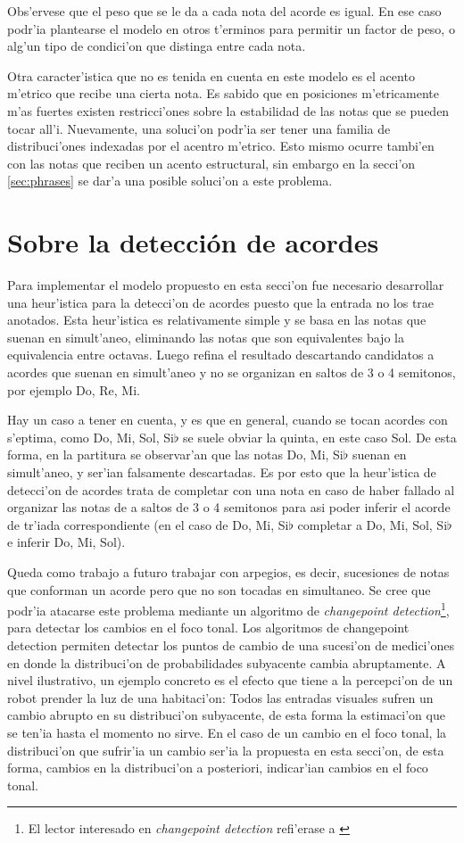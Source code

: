 Obs'ervese que el peso que se le da a cada nota del acorde es igual. En ese caso podr'ia plantearse el modelo en otros t'erminos para permitir un factor de peso, o
alg'un tipo de condici'on que distinga entre cada nota. 

Otra caracter'istica que no es tenida en cuenta en este modelo es el acento m'etrico que recibe una cierta nota. Es sabido que en posiciones m'etricamente m'as fuertes
existen restricci'ones sobre la estabilidad de las notas que se pueden tocar all'i. Nuevamente, una soluci'on podr'ia ser tener una familia de distribuci'ones indexadas
por el acentro m'etrico. Esto mismo ocurre tambi'en con las notas que reciben un acento estructural, sin embargo en la secci'on \ref{sec:phrases} se dar'a una posible
soluci'on a este problema. 

\section{Sobre la detecci\'on de acordes}
Para implementar el modelo propuesto en esta secci'on fue necesario desarrollar una heur'istica para la detecci'on de acordes puesto que la entrada no los trae anotados. 
Esta heur'istica es relativamente simple y se basa en las notas
que suenan en simult'aneo, eliminando las notas que son equivalentes bajo la equivalencia entre octavas. Luego refina el resultado descartando candidatos a acordes que suenan en simult'aneo y no se organizan en saltos de 3 o 4 semitonos, por ejemplo Do, Re, Mi. 

Hay un caso a tener en cuenta, y es que en general, cuando se tocan acordes
con s'eptima, como Do, Mi, Sol, Si$\flat$ se suele obviar la quinta, en este caso Sol. De esta forma, en la partitura se observar'an que las notas Do, Mi, Si$\flat$ suenan
en simult'aneo, y ser'ian falsamente descartadas.  Es por esto que la heur'istica de detecci'on de acordes trata de completar 
con una nota en caso de haber fallado al organizar las notas de a saltos de 3 o 4 semitonos para asi poder inferir el acorde de tr'iada correspondiente (en 
el caso de Do, Mi, Si$\flat$ completar a Do, Mi, Sol, Si$\flat$ e inferir Do, Mi, Sol). 

Queda como trabajo a futuro trabajar con arpegios, es decir, sucesiones de notas que conforman un acorde pero que no son tocadas en simultaneo. 
Se cree que podr'ia atacarse este problema mediante un algoritmo de \emph{changepoint detection}\footnote{El lector interesado en \emph{changepoint detection} refi'erase 
a \cite{adams-mackay-2007}}, para detectar los cambios en el foco tonal. Los algoritmos de changepoint 
detection permiten detectar los puntos de cambio de una sucesi'on de medici'ones en donde la distribuci'on de probabilidades subyacente cambia abruptamente.
A nivel ilustrativo, un ejemplo concreto es el efecto que tiene a la percepci'on de un robot prender la luz de una habitaci'on: Todos las entradas visuales 
sufren un cambio abrupto en su distribuci'on subyacente, de esta forma la estimaci'on que se ten'ia hasta el momento no sirve. En el caso de un cambio
en el foco tonal, la distribuci'on que sufrir'ia un cambio ser'ia la propuesta en esta secci'on, de esta forma, cambios en la distribuci'on a posteriori, indicar'ian
cambios en el foco tonal.

